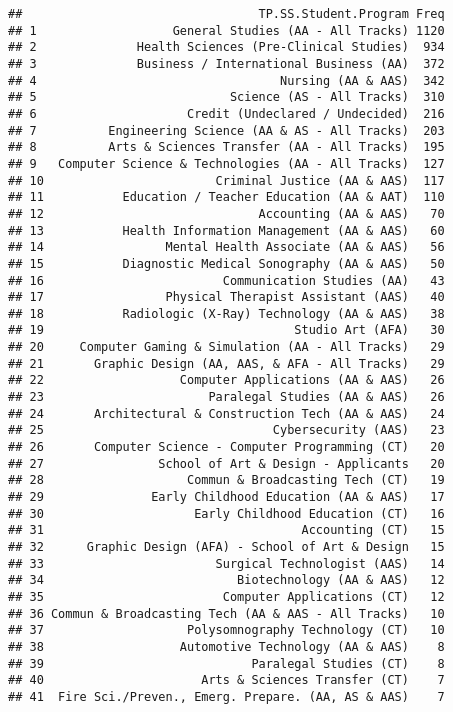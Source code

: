 \documentclass[]{article}
\begin{document}
\begin{verbatim}
##                                 TP.SS.Student.Program Freq
## 1                   General Studies (AA - All Tracks) 1120
## 2              Health Sciences (Pre-Clinical Studies)  934
## 3              Business / International Business (AA)  372
## 4                                  Nursing (AA & AAS)  342
## 5                           Science (AS - All Tracks)  310
## 6                     Credit (Undeclared / Undecided)  216
## 7          Engineering Science (AA & AS - All Tracks)  203
## 8          Arts & Sciences Transfer (AA - All Tracks)  195
## 9   Computer Science & Technologies (AA - All Tracks)  127
## 10                        Criminal Justice (AA & AAS)  117
## 11           Education / Teacher Education (AA & AAT)  110
## 12                              Accounting (AA & AAS)   70
## 13           Health Information Management (AA & AAS)   60
## 14                 Mental Health Associate (AA & AAS)   56
## 15           Diagnostic Medical Sonography (AA & AAS)   50
## 16                         Communication Studies (AA)   43
## 17                 Physical Therapist Assistant (AAS)   40
## 18           Radiologic (X-Ray) Technology (AA & AAS)   38
## 19                                   Studio Art (AFA)   30
## 20     Computer Gaming & Simulation (AA - All Tracks)   29
## 21       Graphic Design (AA, AAS, & AFA - All Tracks)   29
## 22                   Computer Applications (AA & AAS)   26
## 23                       Paralegal Studies (AA & AAS)   26
## 24       Architectural & Construction Tech (AA & AAS)   24
## 25                                Cybersecurity (AAS)   23
## 26       Computer Science - Computer Programming (CT)   20
## 27                School of Art & Design - Applicants   20
## 28                    Commun & Broadcasting Tech (CT)   19
## 29               Early Childhood Education (AA & AAS)   17
## 30                     Early Childhood Education (CT)   16
## 31                                    Accounting (CT)   15
## 32      Graphic Design (AFA) - School of Art & Design   15
## 33                        Surgical Technologist (AAS)   14
## 34                           Biotechnology (AA & AAS)   12
## 35                         Computer Applications (CT)   12
## 36 Commun & Broadcasting Tech (AA & AAS - All Tracks)   10
## 37                    Polysomnography Technology (CT)   10
## 38                   Automotive Technology (AA & AAS)    8
## 39                             Paralegal Studies (CT)    8
## 40                      Arts & Sciences Transfer (CT)    7
## 41  Fire Sci./Preven., Emerg. Prepare. (AA, AS & AAS)    7

\end{verbatim}
\end{document}
